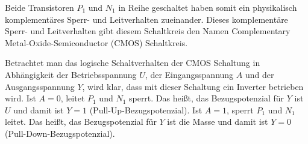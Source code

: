 \documentclass[oneside]{scrarticle}
\numberwithin{equation}{section}
\begin{document}
Beide Transistoren $P_1$ und $N_1$ in Reihe geschaltet haben somit ein physikalisch komplementäres Sperr- und Leitverhalten zueinander. Dieses komplementäre Sperr- und Leitverhalten gibt diesem Schaltkreis den Namen Complementary Metal-Oxide-Semiconductor (CMOS) Schaltkreis.

Betrachtet man das logische Schaltverhalten der CMOS Schaltung in Abhängigkeit der Betriebsspannung $U$, der Eingangsspannung $A$ und der Ausgangsspannung $Y$, wird klar, dass mit dieser Schaltung ein Inverter betrieben wird. Ist $A = 0$, leitet $P_1$ und $N_1$ sperrt. Das heißt, das Bezugspotenzial für $Y$ ist $U$ und damit ist $Y = 1$ (Pull-Up-Bezugspotenzial). Ist $A = 1$, sperrt $P_1$ und $N_1$ leitet. Das heißt, das Bezugspotenzial für $Y$ ist die Masse und damit ist $Y = 0$ (Pull-Down-Bezugspotenzial).
\end{document}
